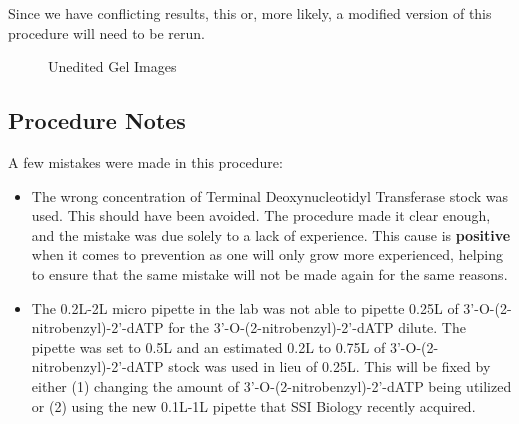 \documentclass[letterpaper]{article}
\newcommand{\tdt}{Terminal Deoxynucleotidyl Transferase}
\newcommand{\uL}{\micro{}L}
\newcommand{\BdATP}{3'-O-(2-nitrobenzyl)-2'-dATP}
\begin{document}
Since we have conflicting results, this or, more likely, a modified version of this procedure will need to be rerun.


\begin{figure}
\begin{center}


\label{gels3}
\caption{Unedited Gel Images}
\end{center}
\end{figure}
\clearpage
\subsection{Procedure Notes}
A few mistakes were made in this procedure:
\begin{itemize}
	\item{The wrong concentration of \tdt{} stock was used. This should have been avoided. The procedure made it clear enough, and the mistake was due solely to a lack of experience. This cause is \textbf{positive} when it comes to prevention as one will only grow more experienced, helping to ensure that the same mistake will not be made again for the same reasons.}
	\item{The 0.2\uL{}-2\uL{} micro pipette in the lab was not able to pipette 0.25\uL{} of \BdATP{} for the \BdATP{} dilute. The pipette was set to 0.5\uL{} and an estimated 0.2\uL{} to 0.75\uL{} of \BdATP{} stock was used in lieu of 0.25\uL{}. This will be fixed by either (1) changing the amount of \BdATP{} being utilized or (2) using the new 0.1\uL{}-1\uL{} pipette that SSI Biology recently acquired.}
\end{itemize}
\listoffigures
\listoftodos


\end{document}
